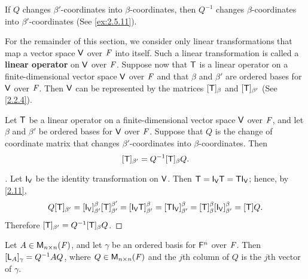 \begin{note}
  If \(Q\) changes \(\beta'\)-coordinates into \(\beta\)-coordinates, then \(Q^{-1}\) changes \(\beta\)-coordinates into \(\beta'\)-coordinates
  (See \cref{ex:2.5.11}).
\end{note}

\begin{defn}\label{2.5.2}
  For the remainder of this section, we consider only linear transformations that map a vector space \(\mathsf{V}\) over \(\mathit{F}\) into itself.
  Such a linear transformation is called a \textbf{linear operator} on \(\mathsf{V}\) over \(\mathit{F}\).
  Suppose now that \(\mathsf{T}\) is a linear operator on a finite-dimensional vector space \(\mathsf{V}\) over \(\mathit{F}\) and that \(\beta\) and \(\beta'\) are ordered bases for \(\mathsf{V}\) over \(\mathit{F}\).
  Then \(\mathsf{V}\) can be represented by the matrices \([\mathsf{T}]_{\beta}\) and \([\mathsf{T}]_{\beta'}\)
  (See \cref{2.2.4}).
\end{defn}

\begin{thm}\label{2.23}
  Let \(\mathsf{T}\) be a linear operator on a finite-dimensional vector space \(\mathsf{V}\) over \(\mathit{F}\), and let \(\beta\) and \(\beta'\) be ordered bases for \(\mathsf{V}\) over \(\mathit{F}\).
  Suppose that \(Q\) is the change of coordinate matrix that changes \(\beta'\)-coordinates into \(\beta\)-coordinates.
  Then
  \[
    [\mathsf{T}]_{\beta'} = Q^{-1} [\mathsf{T}]_{\beta} Q.
  \]
\end{thm}

\begin{proof}[]
  Let \(\IT[\V]\) be the identity transformation on \(\mathsf{V}\).
  Then \(\T = \IT[\V] \T = \T \IT[\V]\);
  hence, by \cref{2.11},
  \[
    Q [\T]_{\beta'} = [\IT[\V]]_{\beta'}^{\beta} [\T]_{\beta'}^{\beta'} = [\IT[\V] \T]_{\beta'}^{\beta} = [\T \IT[\V]]_{\beta'}^{\beta} = [\T]_{\beta}^{\beta} [\IT[\V]]_{\beta'}^{\beta} = [\T] Q.
  \]
  Therefore \([\mathsf{T}]_{\beta'} = Q^{-1} [\mathsf{T}]_{\beta} Q\).
\end{proof}

\begin{cor}\label{2.5.3}
  Let \(A \in \mathsf{M}_{{n} \times n}({\mathit{F}})\), and let \(\gamma\) be an ordered basis for \(\mathsf{F}^n\) over \(\mathit{F}\).
  Then \([\mathsf{L}_A]_{\gamma} = Q^{-1} A Q\), where \(Q \in \mathsf{M}_{{n} \times n}({\mathit{F}})\) and the \(j\)th column of \(Q\) is the \(j\)th vector of \(\gamma\).
\end{cor}

